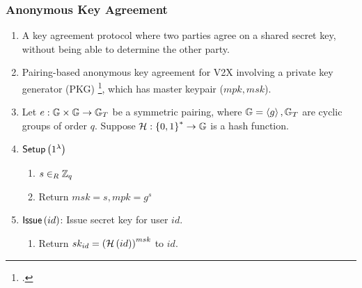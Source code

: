 \documentclass{beamer}
\begin{document}
    \begin{frame}
        \frametitle{Anonymous Key Agreement}
        \begin{enumerate}
            \item<1-> A key agreement protocol where two parties agree on a
            shared secret key, without being able to determine the other party.
            \item<2-> Pairing-based anonymous key agreement for V2X involving a
            private key generator (PKG)
            \footcite{katePairingBasedOnionRouting2007}, which has master
            keypair (\(mpk, msk\)).
            \item<3-> Let \(e: \mathbb G \times \mathbb G \rightarrow \mathbb G_T\) be a symmetric
            pairing, where \(\mathbb G = \left\langle g \right\rangle, \mathbb G_T\) are cyclic groups of order
            \(q\). Suppose \(\mathcal H : \left\{0,1\right\}^* \rightarrow \mathbb G\) is a hash
            function.
            \item<4-> \(\mathsf{Setup}\left(1^\lambda\right)\)
            \begin{enumerate}
                \item \(s \in_R \mathbb Z_q\)
                \item Return \(msk = s, mpk = g^s\)
            \end{enumerate}
            \item<5-> \(\mathsf{Issue}\left(id\right)\): Issue secret key for user
            \(id\).
            \begin{enumerate}
                \item Return \(sk_{id} = \left(\mathcal H\left(id\right)\right)^{msk}\) to \(id\).
            \end{enumerate}
        \end{enumerate}
    \end{frame}
\end{document}

